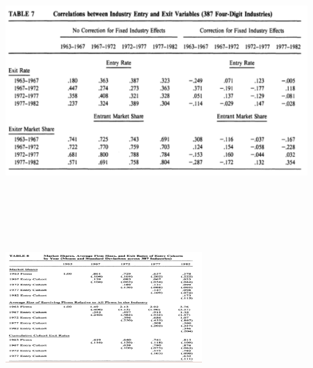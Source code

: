 \documentclass[dvipdfmx,14pt]{beamer}
\begin{document}
\begin{frame}

\begin{center}

\includegraphics[width=11.5cm,height=7.5cm]{DRS_T7.pdf}

\end{center}

\end{frame}

\begin{frame}

\begin{center}

\includegraphics[width=7.5cm,height=8cm]{DRS_T8.pdf}

\end{center}

\end{frame}
\end{document}
